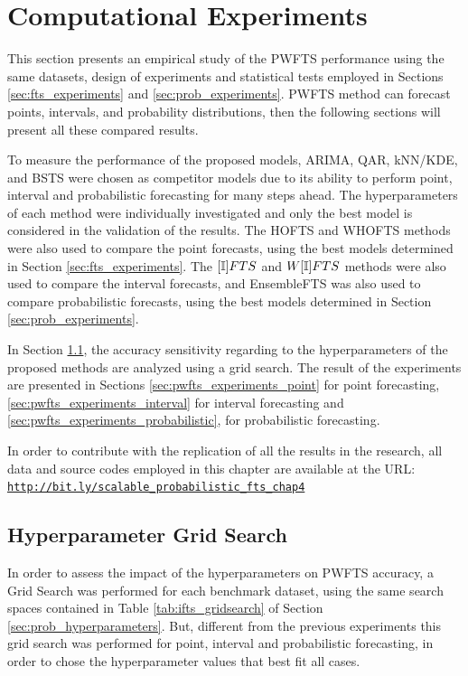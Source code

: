 \section{Computational Experiments}
\label{sec:pwfts_experiments}

This section presents an empirical study of the PWFTS performance using the same datasets, design of experiments and statistical tests employed in Sections \ref{sec:fts_experiments} and \ref{sec:prob_experiments}. PWFTS method can forecast points, intervals, and probability distributions, then the following sections will present all these compared results.

To measure the performance of the proposed models, ARIMA, QAR, kNN/KDE, and BSTS were chosen as competitor models due to its ability to perform point, interval and probabilistic forecasting for many steps ahead. The hyperparameters of each method were individually investigated and only the best model is considered in the validation of the results. The HOFTS and WHOFTS methods were also used to compare the point forecasts, using the best models determined in Section \ref{sec:fts_experiments}. The $[\mathbb{I}]FTS$ and $W[\mathbb{I}]FTS$ methods were also used to compare the interval forecasts, and EnsembleFTS was also used to compare probabilistic forecasts, using the best models determined in Section \ref{sec:prob_experiments}.

In Section \ref{sec:pwfts_hyperparameters}, the accuracy sensitivity regarding to the hyperparameters of the proposed methods are analyzed using a grid search. The result of the experiments are presented in Sections \ref{sec:pwfts_experiments_point} for point forecasting, \ref{sec:pwfts_experiments_interval} for interval forecasting  and  \ref{sec:pwfts_experiments_probabilistic}, for probabilistic forecasting.

In order to contribute with the replication of all the results in the research, all data and source codes employed in this chapter are available at the URL:
\texttt{\url{http://bit.ly/scalable_probabilistic_fts_chap4}}

\subsection{Hyperparameter Grid Search}
\label{sec:pwfts_hyperparameters}

In order to assess the impact of the hyperparameters on PWFTS accuracy, a Grid Search was performed for each benchmark dataset, using the same search spaces contained in Table \ref{tab:ifts_gridsearch} of Section \ref{sec:prob_hyperparameters}. But, different from the previous experiments this grid search was performed for point, interval and probabilistic forecasting, in order to chose the hyperparameter values that best fit all cases.

